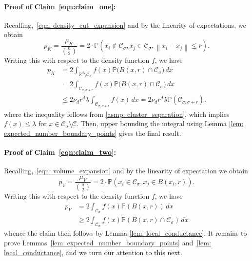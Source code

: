 \documentclass[11pt,twoside]{article}
\newcommand{\Reals}{\mathbb{R}}
\newcommand{\Rd}{\Reals^d}
\newcommand{\norm}[1]{\left\lVert#1\right\rVert}
\newcommand{\1}{\mathbf{1}}
\newcommand{\Pbb}{\mathbb{P}}
\newcommand{\Cset}{\mathcal{C}}
\newcommand{\Csig}{\Cset_{\sigma}}
\newcommand{\Csigr}{\Cset_{\sigma,\sigma + r}}
\newcommand{\dx}{\,dx}
\begin{document}
\paragraph{Proof of Claim~\eqref{eqn:claim_one}: } Recalling,~\eqref{eqn: density_cut_expansion} 
	and by the linearity of expectations, we obtain
	\begin{equation*}
	p_K = \frac{\mu_K}{{n \choose 2}} = 2 \cdot \Pbb(x_i \not\in \Csig, x_j \in \Csig, \norm{x_i - x_j} \leq r). \tag{for each $i,j$, $i \neq j$}
	\end{equation*}
	Writing this with respect to the density function $f$, we have
	\begin{align*}
	p_K & = 2 \int_{\Rd \setminus \Csig} f(x) \Pbb\bigl(B(x,r) \cap \Csig\bigr) \dx \\
	& = 2 \int_{\Csigr} f(x) \Pbb\bigl(B(x,r) \cap \Csig\bigr) \dx \\
	& \leq 2 \nu_d r^d \lambda  \int_{\Csigr} f(x) \dx = 2 \nu_d r^d \lambda \Pbb(\Csigr).
	\end{align*}
	where the inequality follows from \ref{asmp: cluster_separation}, which implies $f(x) \leq \lambda$ for $x \in \Csig \setminus \Cset$. Then, upper bounding the integral using Lemma \ref{lem: expected_number_boundary_points} gives the final result.


\paragraph{Proof of Claim~\eqref{eqn:claim_two}: } Recalling,~\eqref{eqn: volume_expansion}
	and by the linearity of expectation we obtain
	\begin{equation*}
	p_V = \frac{\mu_V}{{n \choose 2}} = 2 \cdot \Pbb(x_i \in \Csig, x_j \in B(x_i,r)). \tag{for any $i,j$, $i \neq j$. }
	\end{equation*}
	Writing this with respect to the density function $f$, we have
	\begin{align*}
	p_V & = 2 \int_{\Csig} f(x) \Pbb(B(x,r)) \dx \\
	& \geq 2 \int_{\Csig} f(x) \Pbb(B(x,r) \cap \Csig) \dx
	\end{align*}
	whence the claim then follows by Lemma \ref{lem: local_conductance}.
It remains to prove Lemmas~\ref{lem: expected_number_boundary_points} and~\ref{lem: local_conductance}, and we turn our attention to this next.
\end{document}
